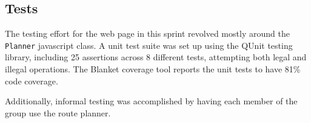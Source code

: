 \subsection{Tests}

The testing effort for the web page in this sprint revolved mostly around the \texttt{Planner} javascript class. A unit test suite was set up using the QUnit testing library\cite{qunit}, including 25 assertions across 8 different tests, attempting both legal and illegal operations. The Blanket coverage tool\cite{blanketjs} reports the unit tests to have 81\% code coverage.

Additionally, informal testing was accomplished by having each member of the group use the route planner.
